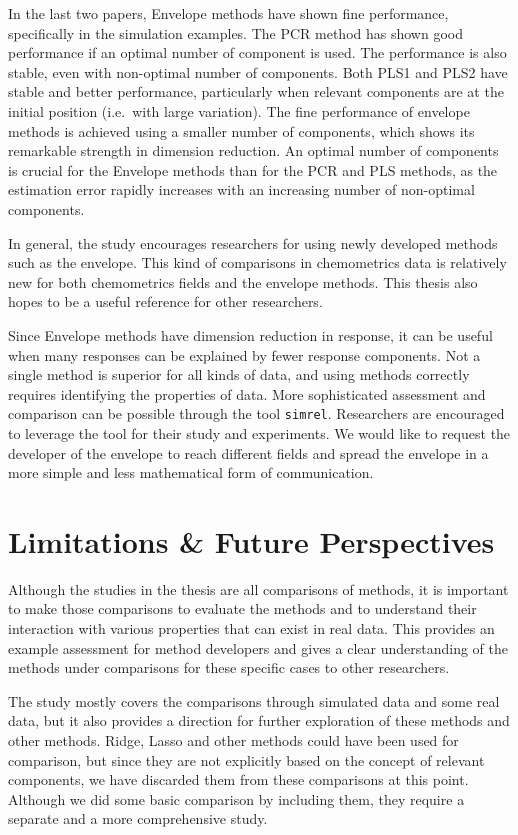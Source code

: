 \documentclass[11pt,twoside,openright,titlepage,
  headinclude,footinclude,BCOR=5mm,
  numbers=noenddot,cleardoublepage=empty,
  tablecaptionabove, dottedtoc,
  bibliography=totoc,paper=a4]{scrreprt}
\begin{document}
In the last two papers, Envelope methods have shown fine performance, specifically in the simulation examples. The PCR method has shown good performance if an optimal number of component is used. The performance is also stable, even with non-optimal number of components. Both PLS1 and PLS2 have stable and better performance, particularly when relevant components are at the initial position (i.e.~with large variation). The fine performance of envelope methods is achieved using a smaller number of components, which shows its remarkable strength in dimension reduction. An optimal number of components is crucial for the Envelope methods than for the PCR and PLS methods, as the estimation error rapidly increases with an increasing number of non-optimal components.

In general, the study encourages researchers for using newly developed methods such as the envelope. This kind of comparisons in chemometrics data is relatively new for both chemometrics fields and the envelope methods. This thesis also hopes to be a useful reference for other researchers.

Since Envelope methods have dimension reduction in response, it can be useful when many responses can be explained by fewer response components. Not a single method is superior for all kinds of data, and using methods correctly requires identifying the properties of data. More sophisticated assessment and comparison can be possible through the tool \texttt{simrel}. Researchers are encouraged to leverage the tool for their study and experiments. We would like to request the developer of the envelope to reach different fields and spread the envelope in a more simple and less mathematical form of communication.

\hypertarget{limitations-future-perspectives}{%
\chapter{Limitations \& Future Perspectives}\label{limitations-future-perspectives}}

Although the studies in the thesis are all comparisons of methods, it is important to make those comparisons to evaluate the methods and to understand their interaction with various properties that can exist in real data. This provides an example assessment for method developers and gives a clear understanding of the methods under comparisons for these specific cases to other researchers.

The study mostly covers the comparisons through simulated data and some real data, but it also provides a direction for further exploration of these methods and other methods. Ridge, Lasso and other methods could have been used for comparison, but since they are not explicitly based on the concept of relevant components, we have discarded them from these comparisons at this point. Although we did some basic comparison by including them, they require a separate and a more comprehensive study.
\end{document}
